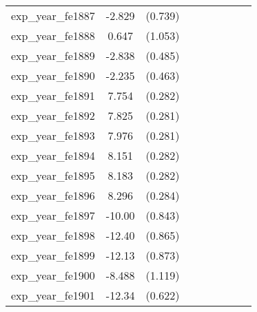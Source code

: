 {\begin{tabular}{l*{4}{cc}}
exp\_year\_fe1887&   -2.829\sym{***}&  (0.739)&                  &         &                  &         &                  &         \\
exp\_year\_fe1888&    0.647         &  (1.053)&                  &         &                  &         &                  &         \\
exp\_year\_fe1889&   -2.838\sym{***}&  (0.485)&                  &         &                  &         &                  &         \\
exp\_year\_fe1890&   -2.235\sym{***}&  (0.463)&                  &         &                  &         &                  &         \\
exp\_year\_fe1891&    7.754\sym{***}&  (0.282)&                  &         &                  &         &                  &         \\
exp\_year\_fe1892&    7.825\sym{***}&  (0.281)&                  &         &                  &         &                  &         \\
exp\_year\_fe1893&    7.976\sym{***}&  (0.281)&                  &         &                  &         &                  &         \\
exp\_year\_fe1894&    8.151\sym{***}&  (0.282)&                  &         &                  &         &                  &         \\
exp\_year\_fe1895&    8.183\sym{***}&  (0.282)&                  &         &                  &         &                  &         \\
exp\_year\_fe1896&    8.296\sym{***}&  (0.284)&                  &         &                  &         &                  &         \\
exp\_year\_fe1897&   -10.00\sym{***}&  (0.843)&                  &         &                  &         &                  &         \\
exp\_year\_fe1898&   -12.40\sym{***}&  (0.865)&                  &         &                  &         &                  &         \\
exp\_year\_fe1899&   -12.13\sym{***}&  (0.873)&                  &         &                  &         &                  &         \\
exp\_year\_fe1900&   -8.488\sym{***}&  (1.119)&                  &         &                  &         &                  &         \\
exp\_year\_fe1901&   -12.34\sym{***}&  (0.622)&                  &         &                  &         &                  &         \\

\end{tabular}}
